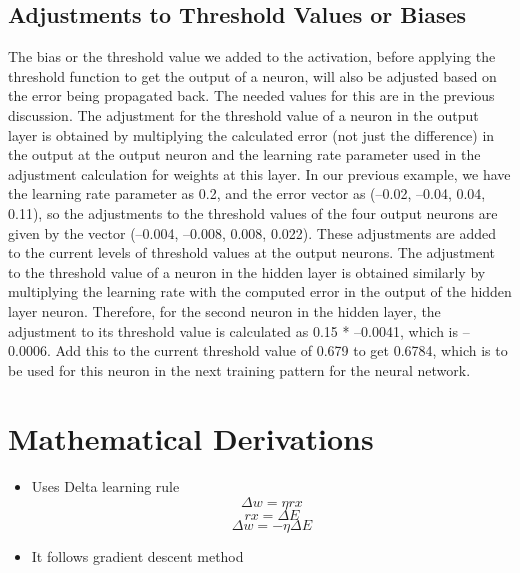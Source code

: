 \documentclass[12pt, right open]{memoir}
\begin{document}
\subsection{Adjustments to Threshold Values or Biases}
The bias or the threshold value we added to the activation, before applying the
threshold function to get the output of a neuron, will also be adjusted based on
the error being propagated back. The needed values for this are in the previous
discussion.
The adjustment for the threshold value of a neuron in the output layer is
obtained by multiplying the calculated error (not just the difference) in the
output at the output neuron and the learning rate parameter used in the
adjustment calculation for weights at this layer. In our previous example, we
have the learning rate parameter as 0.2, and the error vector as (–0.02, –0.04,
0.04, 0.11), so the adjustments to the threshold values of the four output
neurons are given by the vector (–0.004, –0.008, 0.008, 0.022). These
adjustments are added to the current levels of threshold values at the output
neurons.
The adjustment to the threshold value of a neuron in the hidden layer is
obtained similarly by multiplying the learning rate with the computed error in
the output of the hidden layer neuron. Therefore, for the second neuron in the
hidden layer, the adjustment to its threshold value is calculated as 0.15 *
–0.0041, which is –0.0006. Add this to the current threshold value of 0.679 to
get 0.6784, which is to be used for this neuron in the next training pattern for
the neural network.

\section{Mathematical Derivations}

\begin{itemize}

\item Uses Delta learning rule
\[ 
\Delta w = \eta r x 
\]
\[
rx = \Delta E
\]
\[
\Delta w = - \eta \Delta E
\]
\item It follows gradient descent method
\end{itemize}
\end{document}

